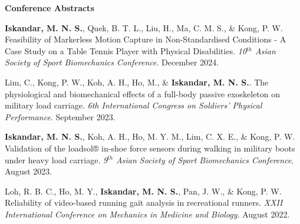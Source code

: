 \documentclass[../main.tex]{subfiles}
\begin{document}
        \textbf{Conference Abstracts}
        \def\labelprefix{CA}
        \begin{etaremune}
            \item\label{conference_abstract: assbTableTennisMarkerless} {\textbf{Iskandar, M. N. S.}, Quek, B. T. L., Liu, H., Ma, C. M. S., \& Kong, P. W. Feasibility of Markerless Motion Capture in Non-Standardised Conditions - A Case Study on a Table Tennis Player with Physical Disabilities. \textit{10$^{th}$ Asian Society of Sport Biomechanics Conference}. December 2024.}
            
            \item\label{conference_abstract: cherylMilitary} {Lim, C., Kong, P. W., Koh, A. H., Ho, M., \& \textbf{Iskandar, M. N. S.}. The physiological and biomechanical effects of a full-body passive exoskeleton on military load carriage. \textit{6th International Congress on Soldiers' Physical Performance}. September 2023. {\href{https://cdn.asp.events/CLIENT_CLDD_9BDAB70C_5056_B733_4934A7872C9C46B0/sites/dsei-2023/media/ICSPP_program_book.pdf}{\faFilePdfO}}}

            \item\label{conference_abstract: assbLoadsolValidation} {\textbf{Iskandar, M. N. S.}, Koh, A. H., Ho, M. Y. M., Lim, C. X. E., \& Kong, P. W. Validation of the loadsol® in-shoe force sensors during walking in military boots under heavy load carriage. \textit{9$^{th}$ Asian Society of Sport Biomechanics Conference}. August 2023.}
            
            \item\label{conference_abstract: rayReliability} {Loh, R. B. C., Ho, M. Y., \textbf{Iskandar, M. N. S.}, Pan, J. W., \& Kong, P. W. Reliability of video-based running gait analysis in recreational runners. \textit{XXII International Conference on Mechanics in Medicine and Biology}. August 2022.}
        \end{etaremune}
        
            
        
  \resumeSubHeadingListEnd
\end{document}
